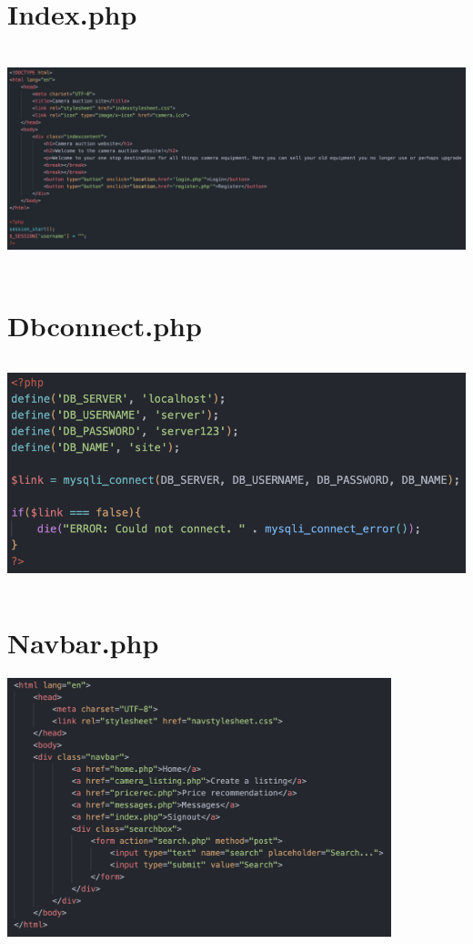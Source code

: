 \section*{Index.php}

\includegraphics[width=6.26806in,height=2.49722in]{ch6_appendix/media/image2.png}

\section*{Dbconnect.php}

\includegraphics[width=5.88889in,height=2.56944in]{ch6_appendix/media/image3.png}

\section*{Navbar.php}

\includegraphics[width=4.39706in,height=2.95947in]{ch6_appendix/media/image4.png}

